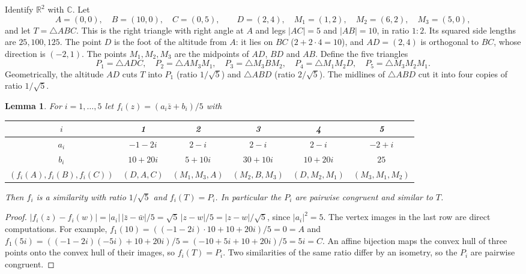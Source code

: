 \documentclass[11pt]{article}
\newtheorem{lemma}[theorem]{Lemma}
\theoremstyle{definition}
\theoremstyle{remark}
\begin{document}
Identify $\mathbb R^2$ with $\mathbb C$. Let
\[
A=(0,0),\quad B=(10,0),\quad C=(0,5),\qquad
D=(2,4),\quad M_1=(1,2),\quad M_2=(6,2),\quad M_3=(5,0),
\]
and let $T=\triangle ABC$. This is the right triangle with right angle at $A$ and legs
$|AC|=5$ and $|AB|=10$, in ratio $1:2$. Its squared side lengths are $25,100,125$. The
point $D$ is the foot of the altitude from $A$: it lies on $BC$ ($2+2\cdot4=10$), and
$AD=(2,4)$ is orthogonal to $BC$, whose direction is $(-2,1)$. The points $M_1,M_2,M_3$
are the midpoints of $AD$, $BD$ and $AB$. Define the five triangles
\[
P_1=\triangle ADC,\quad P_2=\triangle AM_3M_1,\quad P_3=\triangle M_3BM_2,\quad
P_4=\triangle M_1M_2D,\quad P_5=\triangle M_3M_2M_1 .
\]
Geometrically, the altitude $AD$ cuts $T$ into $P_1$ (ratio $1/\sqrt5$) and
$\triangle ABD$ (ratio $2/\sqrt5$). The midlines of $\triangle ABD$ cut it into four
copies of ratio $1/\sqrt5$.

\begin{lemma}\label{lem:sim}
For $i=1,\dots,5$ let $f_i(z)=(a_i\bar z+b_i)/5$ with
\begin{center}
\begin{tabular}{cccccc}
\toprule
$i$ & 1 & 2 & 3 & 4 & 5\\
\midrule
$a_i$ & $-1-2i$ & $2-i$ & $2-i$ & $2-i$ & $-2+i$\\
$b_i$ & $10+20i$ & $5+10i$ & $30+10i$ & $10+20i$ & $25$\\
$(f_i(A),f_i(B),f_i(C))$ & $(D,A,C)$ & $(M_1,M_3,A)$ & $(M_2,B,M_3)$ & $(D,M_2,M_1)$ & $(M_3,M_1,M_2)$\\
\bottomrule
\end{tabular}
\end{center}
Then $f_i$ is a similarity with ratio $1/\sqrt5$ and $f_i(T)=P_i$. In particular the
$P_i$ are pairwise congruent and similar to $T$.
\end{lemma}

\begin{proof}
$|f_i(z)-f_i(w)|=|a_i|\,|\bar z-\bar w|/5=\sqrt5\,|z-w|/5=|z-w|/\sqrt5$, since
$|a_i|^2=5$. The vertex images in the last row are direct computations. For example,
$f_1(10)=((-1-2i)\cdot10+10+20i)/5=0=A$ and $f_1(5i)=((-1-2i)(-5i)+10+20i)/5=(-10+5i+10+20i)/5=5i=C$.
An affine bijection maps the convex hull of three points onto the convex hull of their
images, so $f_i(T)=P_i$. Two similarities of the same ratio differ by an isometry, so the
$P_i$ are pairwise congruent.
\end{proof}
\end{document}
